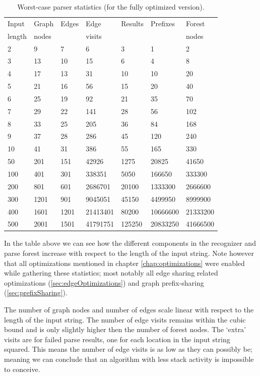 \documentclass[a4paper,10pt]{article}
\begin{document}
\begin{table}[H]
\centering
\begin{tabular}{ | p{7ex} | p{7ex} | p{7ex} | p{10ex} | p{8ex} | p{10ex} | p{10ex} | }
  \hline
  Input & Graph & Edges & Edge & Results & Prefixes & Forest \\
  length & nodes & & visits & & & nodes \\
  \hline
  2 & 9 & 7 & 6 & 3 & 1 & 2 \\
  3 & 13 & 10 & 15 & 6 & 4 & 8 \\
  4 & 17 & 13 & 31 & 10 & 10 & 20 \\
  5 & 21 & 16 & 56 & 15 & 20 & 40 \\
  6 & 25 & 19 & 92 & 21 & 35 & 70 \\
  7 & 29 & 22 & 141 & 28 & 56 & 102 \\
  8 & 33 & 25 & 205 & 36 & 84 & 168 \\
  9 & 37 & 28 & 286 & 45 & 120 & 240 \\
  10 & 41 & 31 & 386 & 55 & 165 & 330 \\
  \hline
  50 & 201 & 151 & 42926 & 1275 & 20825 & 41650 \\
  100 & 401 & 301 & 338351 & 5050 & 166650 & 333300 \\
  200 & 801 & 601 & 2686701 & 20100 & 1333300 & 2666600 \\
  300 & 1201 & 901 & 9045051 & 45150 & 4499950 & 8999900 \\
  400 & 1601 & 1201 & 21413401 & 80200 & 10666600 & 21333200 \\
  500 & 2001 & 1501 & 41791751 & 125250 & 20833250 & 41666500 \\
  \hline
\end{tabular}
\caption{Worst-case parser statistics (for the fully optimized version).}
\end{table}

In the table above we can see how the different components in the recognizer and parse forest increase with respect to the length of the input string. Note however that all optimizations mentioned in chapter \ref{chap:optimizations} were enabled while gathering these statistics; most notably all edge sharing related optimizations (\ref{sec:edgeOptimizations}) and graph prefix-sharing (\ref{sec:prefixSharing}).

The number of graph nodes and number of edges scale linear with respect to the length of the input string. The number of edge visits remains within the cubic bound and is only slightly higher then the number of forest nodes. The `extra' visits are for failed parse results, one for each location in the input string squared. This means the number of edge visits is as low as they can possibly be; meaning we can conclude that an algorithm with less stack activity is impossible to conceive.
\end{document}
